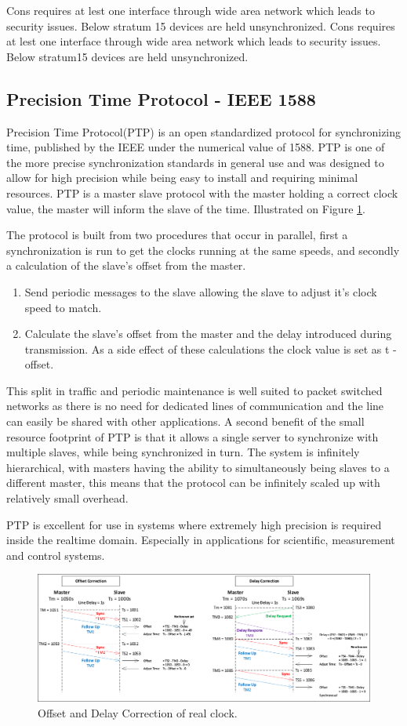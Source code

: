\noindent Cons requires at lest one interface through wide area network which leads to security issues. Below stratum
15 devices are held unsynchronized.
Cons requires at lest one interface through wide area network which leads to security issues. Below stratum15 devices are held unsynchronized.

\subsection{Precision Time Protocol - IEEE 1588}

Precision Time Protocol(PTP) is an open standardized protocol for synchronizing time, published by the IEEE under the numerical value of 1588. PTP is one of the more precise synchronization standards in general use and was designed to allow for high precision while being easy to install and requiring minimal resources. PTP is a master slave protocol with the master holding a correct clock value, the master will inform the slave of the time.  Illustrated on Figure \ref{fig:offsetAndDelayCorrection}.

The protocol is built from two procedures that occur in parallel, first a synchronization is run to get the clocks running at the same speeds, and secondly a calculation of the slave's offset from the master.
\begin{enumerate}
	\item Send periodic messages to the slave allowing the slave to adjust it's clock speed to match.
	\item Calculate the slave's offset from the master and the delay introduced during transmission. As a side effect of these calculations the clock value is set as t - offset.
\end{enumerate}

This split in traffic and periodic maintenance is well suited to packet switched networks as there is no need for dedicated lines of communication and the line can easily be shared with other applications. A second benefit of the small resource footprint of PTP is that it allows a single server to synchronize with multiple slaves, while being synchronized in turn. The system is infinitely hierarchical, with masters having the ability to simultaneously being slaves to a different master, this means that the protocol can be infinitely scaled up with relatively small overhead.

PTP is excellent for use in systems where extremely high precision is required  inside the realtime domain. Especially in applications for scientific, measurement and control systems.

\begin{figure}[H]
	\centering
	\includegraphics[width=\linewidth]{synchronization/realClock/fig/offsetAndDelayCorrection.pdf}
	\caption{Offset and Delay Correction of real clock.}
	\label{fig:offsetAndDelayCorrection}
\end{figure}